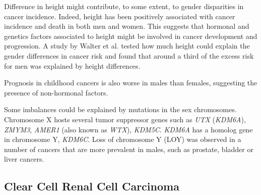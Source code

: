 Difference in height might contribute, to some extent, to gender disparities in cancer incidence.
Indeed, height has been positively associated with cancer incidence and death in both men and women\cite{Wiren2014}.
This suggests that hormonal and genetics factors associated to height might be involved in cancer development and progression.
A study by Walter et al. tested how much height could explain the gender differences in cancer risk and found that around a third of the excess risk for men was explained by height differences\cite{Walter2013}.
\begin{comment}
  But taller people may simply have more cells, or it may be that many determinants of growth during normal development (perhaps including {\it IGF-1}) also have general effects on tumor growth.
\end{comment}
Prognosis in childhood cancers is also worse in males than females, suggesting the presence of non-hormonal factors\cite{Eden2000}.

Some imbalances could be explained by mutations in the sex chromosomes.
Chromosome X hosts several tumor suppressor genes such as {\it UTX} ({\it KDM6A}), {\it ZMYM3}, {\it AMER1} (also known as {\it WTX}), {\it KDM5C}.
{\it KDM6A} has a homolog gene in chromosome Y, {\it KDM6C}.
Loss of chromosome Y (LOY) was observed in a number of cancers that are more prevalent in males, such as prostate, bladder or liver cancers\cite{Konig1996,Sauter1995,Park2006}.

\subsection{Clear Cell Renal Cell Carcinoma}

